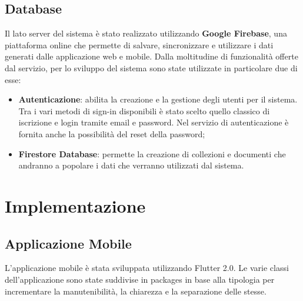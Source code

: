 \documentclass[12pt,a4paper,twoside,openright,titlepage]{book}
\begin{document}
\section{Database}
Il lato server del sistema è stato realizzato utilizzando \textbf{Google Firebase}, una piattaforma online che permette di salvare, sincronizzare e utilizzare i dati generati dalle applicazione web e mobile. Dalla moltitudine di funzionalità offerte dal servizio, per lo sviluppo del sistema sono state utilizzate in particolare due di esse:
\begin{itemize}
\item \textbf{Autenticazione}: abilita la creazione e la gestione degli utenti per il sistema. Tra i vari metodi di sign-in disponibili è stato scelto quello classico di iscrizione e login tramite email e password. Nel servizio di autenticazione è fornita anche la possibilità del reset della password;
\item \textbf{Firestore Database}: permette la creazione di collezioni e documenti che andranno a popolare i dati che verranno utilizzati dal sistema.
\end{itemize}

\chapter{Implementazione}
\section{Applicazione Mobile}
L'applicazione mobile è stata sviluppata utilizzando Flutter 2.0. Le varie classi dell'applicazione sono state suddivise in packages in base alla tipologia per incrementare la manutenibilità, la chiarezza e la separazione delle stesse.
\end{document}
